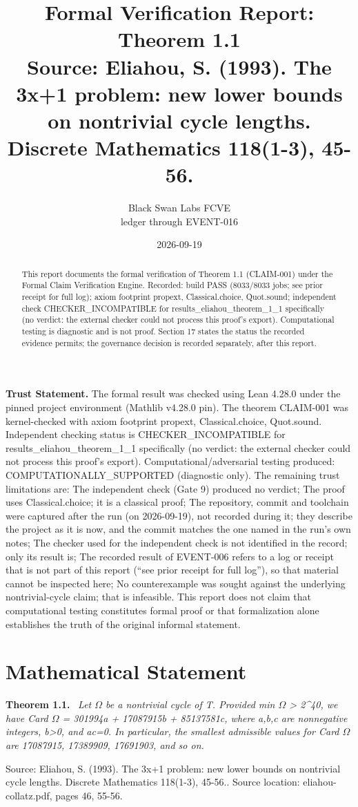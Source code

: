 \documentclass[11pt]{article}
\title{Formal Verification Report: Theorem 1.1\\[0.5em]{\large Source: Eliahou, S. (1993). The 3x+1 problem: new lower bounds on nontrivial cycle lengths. Discrete Mathematics 118(1-3), 45-56.}}
\author{Black Swan Labs FCVE \\ ledger through EVENT-016}
\date{2026-09-19}
\newenvironment{sourceresult}[1]{\par\medskip\noindent\textbf{#1.}\ \itshape}{\par\medskip}
\begin{document}
\maketitle

\noindent\textbf{Trust Statement.} The formal result was checked using Lean 4.28.0 under the pinned project environment (Mathlib v4.28.0 pin). The theorem CLAIM-001 was kernel-checked with axiom footprint propext, Classical.choice, Quot.sound. Independent checking status is CHECKER\_INCOMPATIBLE for results\_eliahou\_theorem\_1\_1 specifically (no verdict: the external checker could not process this proof's export). Computational/adversarial testing produced: COMPUTATIONALLY\_SUPPORTED (diagnostic only). The remaining trust limitations are: The independent check (Gate 9) produced no verdict; The proof uses Classical.choice; it is a classical proof; The repository, commit and toolchain were captured after the run (on 2026-09-19), not recorded during it; they describe the project as it is now, and the commit matches the one named in the run's own notes; The checker used for the independent check is not identified in the record; only its result is; The recorded result of EVENT-006 refers to a log or receipt that is not part of this report (``see prior receipt for full log''), so that material cannot be inspected here; No counterexample was sought against the underlying nontrivial-cycle claim; that is infeasible. This report does not claim that computational testing constitutes formal proof or that formalization alone establishes the truth of the original informal statement.

\begin{abstract}
This report documents the formal verification of Theorem 1.1 (CLAIM-001) under the Formal Claim Verification Engine. Recorded: build PASS (8033/8033 jobs; see prior receipt for full log); axiom footprint propext, Classical.choice, Quot.sound; independent check CHECKER\_INCOMPATIBLE for results\_eliahou\_theorem\_1\_1 specifically (no verdict: the external checker could not process this proof's export). Computational testing is diagnostic and is not proof. Section 17 states the status the recorded evidence permits; the governance decision is recorded separately, after this report.
\end{abstract}

\section{Mathematical Statement}
\begin{sourceresult}{Theorem 1.1}
Let \ensuremath{\Omega} be a nontrivial cycle of T. Provided min \ensuremath{\Omega} > 2\textasciicircum{}40, we have Card \ensuremath{\Omega} = 301994a + 17087915b + 85137581c, where a,b,c are nonnegative integers, b>0, and ac=0. In particular, the smallest admissible values for Card \ensuremath{\Omega} are 17087915, 17389909, 17691903, and so on.
\end{sourceresult}
Source: Eliahou, S. (1993). The 3x+1 problem: new lower bounds on nontrivial cycle lengths. Discrete Mathematics 118(1-3), 45-56.. Source location: eliahou-collatz.pdf, pages 46, 55-56.
\end{document}
